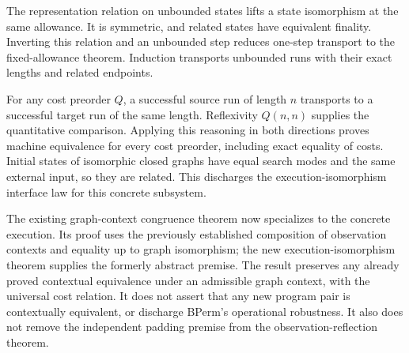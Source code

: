 




The representation relation on unbounded states lifts a state
isomorphism at the same allowance. It is symmetric, and related states have
equivalent finality. Inverting this relation and an unbounded step reduces
one-step transport to the fixed-allowance theorem. Induction transports
unbounded runs with their exact lengths and related endpoints.






For any cost preorder $Q$, a successful source run of length $n$
transports to a successful target run of the same length. Reflexivity
$Q(n,n)$ supplies the quantitative comparison. Applying this reasoning in
both directions proves machine equivalence for every cost preorder,
including exact equality of costs. Initial states of isomorphic closed
graphs have equal search modes and the same external input, so they are
related. This discharges the execution-isomorphism interface law for this
concrete subsystem.




The existing graph-context congruence theorem now specializes to the
concrete execution. Its proof uses the previously established composition
of observation contexts and equality up to graph isomorphism; the new
execution-isomorphism theorem supplies the formerly abstract premise.
The result preserves any already proved contextual equivalence under an
admissible graph context, with the universal cost relation. It does not
assert that any new program pair is contextually equivalent, or discharge
BPerm's operational robustness. It also does not remove the independent
padding premise from the observation-reflection theorem.

